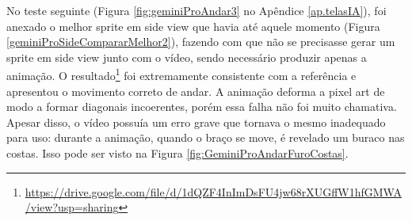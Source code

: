 No teste seguinte (Figura \ref{fig:geminiProAndar3} no Apêndice \ref{ap.telasIA}), foi anexado o melhor sprite em side view que havia até aquele momento (Figura \ref{geminiProSideCompararMelhor2}), fazendo com que não se precisasse gerar um sprite em side view junto com o vídeo, sendo necessário produzir apenas a animação. O resultado\footnote{\url{https://drive.google.com/file/d/1dQZF4InImDsFU4jw68rXUGffW1hfGMWA/view?usp=sharing}} foi extremamente consistente com a referência e apresentou o movimento correto de andar. A animação deforma a pixel art de modo a formar diagonais incoerentes, porém essa falha não foi muito chamativa. Apesar disso, o vídeo possuía um erro grave que tornava o mesmo inadequado para uso: durante a animação, quando o braço se move, é revelado um buraco nas costas. Isso pode ser visto na Figura \ref{fig:GeminiProAndarFuroCostas}. 
